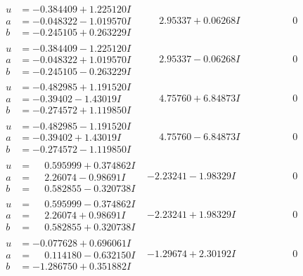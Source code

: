 \documentclass[1p]{elsarticle_modified}
\theoremstyle{definition}
\begin{document}
$$\begin{array}{c|c|c}
\begin{aligned}
u &= -0.384409 + 1.225120 I \\
a &= -0.048322 - 1.019570 I \\
b &= -0.245105 + 0.263229 I\end{aligned}
 & \phantom{-}2.95337 + 0.06268 I & \phantom{-0.000000 } 0 \\ \hline\begin{aligned}
u &= -0.384409 - 1.225120 I \\
a &= -0.048322 + 1.019570 I \\
b &= -0.245105 - 0.263229 I\end{aligned}
 & \phantom{-}2.95337 - 0.06268 I & \phantom{-0.000000 } 0 \\ \hline\begin{aligned}
u &= -0.482985 + 1.191520 I \\
a &= -0.39402 - 1.43019 I \\
b &= -0.274572 + 1.119850 I\end{aligned}
 & \phantom{-}4.75760 + 6.84873 I & \phantom{-0.000000 } 0 \\ \hline\begin{aligned}
u &= -0.482985 - 1.191520 I \\
a &= -0.39402 + 1.43019 I \\
b &= -0.274572 - 1.119850 I\end{aligned}
 & \phantom{-}4.75760 - 6.84873 I & \phantom{-0.000000 } 0 \\ \hline\begin{aligned}
u &= \phantom{-}0.595999 + 0.374862 I \\
a &= \phantom{-}2.26074 - 0.98691 I \\
b &= \phantom{-}0.582855 - 0.320738 I\end{aligned}
 & -2.23241 - 1.98329 I & \phantom{-0.000000 } 0 \\ \hline\begin{aligned}
u &= \phantom{-}0.595999 - 0.374862 I \\
a &= \phantom{-}2.26074 + 0.98691 I \\
b &= \phantom{-}0.582855 + 0.320738 I\end{aligned}
 & -2.23241 + 1.98329 I & \phantom{-0.000000 } 0 \\ \hline\begin{aligned}
u &= -0.077628 + 0.696061 I \\
a &= \phantom{-}0.114180 - 0.632150 I \\
b &= -1.286750 + 0.351882 I\end{aligned}
 & -1.29674 + 2.30192 I & \phantom{-0.000000 } 0 \\ \hline\begin{aligned}

\end{aligned}
\end{array}$$
\end{document}
